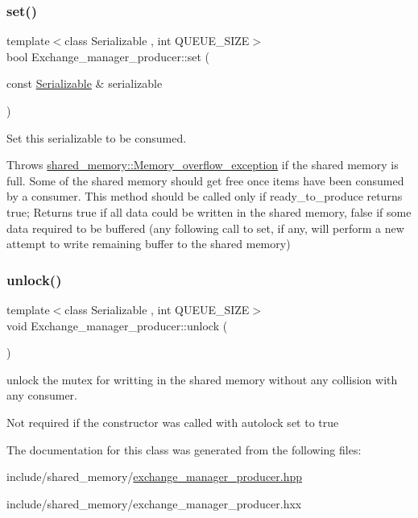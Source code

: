 \subsubsection{\texorpdfstring{set()}{set()}}
{\footnotesize\ttfamily template$<$class Serializable , int Q\+U\+E\+U\+E\+\_\+\+S\+I\+ZE$>$ \\
bool Exchange\+\_\+manager\+\_\+producer\+::set (\begin{DoxyParamCaption}\item[{const \hyperlink{classSerializable}{Serializable} \&}]{serializable }\end{DoxyParamCaption})}



Set this serializable to be consumed. 

Throws \hyperlink{classshared__memory_1_1Memory__overflow__exception}{shared\+\_\+memory\+::\+Memory\+\_\+overflow\+\_\+exception} if the shared memory is full. Some of the shared memory should get free once items have been consumed by a consumer. This method should be called only if \textquotesingle{}ready\+\_\+to\+\_\+produce\textquotesingle{} returns true; Returns true if all data could be written in the shared memory, false if some data required to be buffered (any following call to set, if any, will perform a new attempt to write remaining buffer to the shared memory) \mbox{\label{classshared__memory_1_1Exchange__manager__producer_a9c02040ee5ef8db658f3112ae4b3b969}} 
\subsubsection{\texorpdfstring{unlock()}{unlock()}}
{\footnotesize\ttfamily template$<$class Serializable , int Q\+U\+E\+U\+E\+\_\+\+S\+I\+ZE$>$ \\
void Exchange\+\_\+manager\+\_\+producer\+::unlock (\begin{DoxyParamCaption}{ }\end{DoxyParamCaption})}



unlock the mutex for writting in the shared memory without any collision with any consumer. 

Not required if the constructor was called with autolock set to true 

The documentation for this class was generated from the following files\+:\begin{DoxyCompactItemize}
\item 
include/shared\+\_\+memory/\hyperlink{exchange__manager__producer_8hpp}{exchange\+\_\+manager\+\_\+producer.\+hpp}\item 
include/shared\+\_\+memory/exchange\+\_\+manager\+\_\+producer.\+hxx\end{DoxyCompactItemize}
